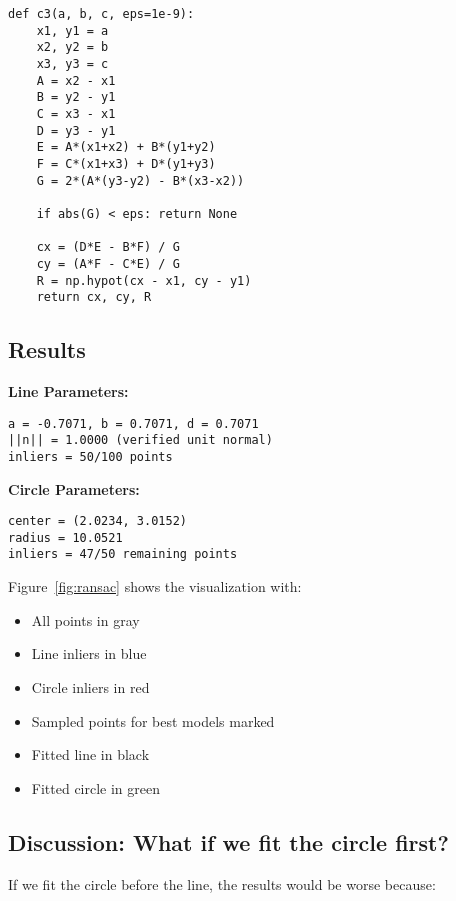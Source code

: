 \documentclass[11pt,a4paper]{article}
\begin{document}
\begin{lstlisting}[caption={Circle fitting from three points}]
def c3(a, b, c, eps=1e-9):
    x1, y1 = a
    x2, y2 = b
    x3, y3 = c
    A = x2 - x1
    B = y2 - y1
    C = x3 - x1
    D = y3 - y1
    E = A*(x1+x2) + B*(y1+y2)
    F = C*(x1+x3) + D*(y1+y3)
    G = 2*(A*(y3-y2) - B*(x3-x2))
    
    if abs(G) < eps: return None
    
    cx = (D*E - B*F) / G
    cy = (A*F - C*E) / G
    R = np.hypot(cx - x1, cy - y1)
    return cx, cy, R
\end{lstlisting}

\subsection{Results}

\textbf{Line Parameters:}
\begin{verbatim}
a = -0.7071, b = 0.7071, d = 0.7071
||n|| = 1.0000 (verified unit normal)
inliers = 50/100 points
\end{verbatim}

\textbf{Circle Parameters:}
\begin{verbatim}
center = (2.0234, 3.0152)
radius = 10.0521
inliers = 47/50 remaining points
\end{verbatim}

Figure~\ref{fig:ransac} shows the visualization with:
\begin{itemize}
    \item All points in gray
    \item Line inliers in blue
    \item Circle inliers in red
    \item Sampled points for best models marked
    \item Fitted line in black
    \item Fitted circle in green
\end{itemize}

\subsection{Discussion: What if we fit the circle first?}

If we fit the circle before the line, the results would be worse because:
\end{document}
